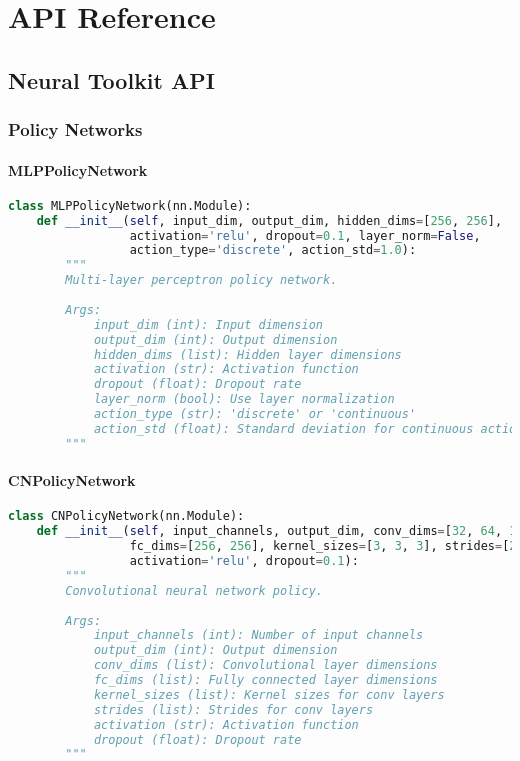 \appendix

\chapter{API Reference}

\section{Neural Toolkit API}

\subsection{Policy Networks}

\subsubsection{MLPPolicyNetwork}

\begin{lstlisting}[language=python]
class MLPPolicyNetwork(nn.Module):
    def __init__(self, input_dim, output_dim, hidden_dims=[256, 256], 
                 activation='relu', dropout=0.1, layer_norm=False, 
                 action_type='discrete', action_std=1.0):
        """
        Multi-layer perceptron policy network.
        
        Args:
            input_dim (int): Input dimension
            output_dim (int): Output dimension
            hidden_dims (list): Hidden layer dimensions
            activation (str): Activation function
            dropout (float): Dropout rate
            layer_norm (bool): Use layer normalization
            action_type (str): 'discrete' or 'continuous'
            action_std (float): Standard deviation for continuous actions
        """
\end{lstlisting}

\subsubsection{CNPolicyNetwork}

\begin{lstlisting}[language=python]
class CNPolicyNetwork(nn.Module):
    def __init__(self, input_channels, output_dim, conv_dims=[32, 64, 128],
                 fc_dims=[256, 256], kernel_sizes=[3, 3, 3], strides=[2, 2, 2],
                 activation='relu', dropout=0.1):
        """
        Convolutional neural network policy.
        
        Args:
            input_channels (int): Number of input channels
            output_dim (int): Output dimension
            conv_dims (list): Convolutional layer dimensions
            fc_dims (list): Fully connected layer dimensions
            kernel_sizes (list): Kernel sizes for conv layers
            strides (list): Strides for conv layers
            activation (str): Activation function
            dropout (float): Dropout rate
        """
\end{lstlisting}

